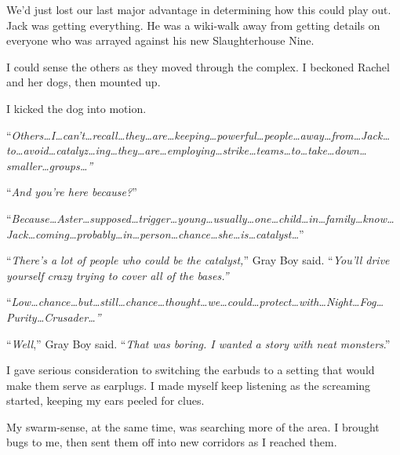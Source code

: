We'd just lost our last major advantage in determining how this could play out.  Jack was getting everything.  He was a wiki-walk away from getting details on everyone who was arrayed against his new Slaughterhouse Nine.



I could sense the others as they moved through the complex.  I beckoned Rachel and her dogs, then mounted up.



I kicked the dog into motion.



``\emph{Others\ldots I\ldots can't\ldots recall\ldots  they\ldots are\ldots keeping\ldots powerful\ldots people\ldots away\ldots from\ldots Jack\ldots to\ldots avoid\ldots catalyz\ldots ing\ldots they\ldots are\ldots employing\ldots strike\ldots teams\ldots to\ldots take\ldots down\ldots smaller\ldots groups\ldots''}



``\emph{And you're here because?}''



``\emph{Because\ldots Aster\ldots supposed\ldots trigger\ldots young\ldots usually\ldots one\ldots child\ldots in\ldots family\ldots know\ldots Jack\ldots coming\ldots probably\ldots in\ldots person\ldots chance\ldots she\ldots is\ldots catalyst\ldots}''



``\emph{There's a lot of people who could be the catalyst,}'' Gray Boy said.  ``\emph{You'll drive yourself crazy trying to cover all of the bases.''}



``\emph{Low\ldots chance\ldots but\ldots still\ldots chance\ldots thought\ldots we\ldots could\ldots protect\ldots with\ldots Night\ldots Fog\ldots Purity\ldots Crusader\ldots''}



``\emph{Well},'' Gray Boy said.  ``\emph{That was boring.  I wanted a story with neat monsters}.''



I gave serious consideration to switching the earbuds to a setting that would make them serve as earplugs.  I made myself keep listening as the screaming started, keeping my ears peeled for clues.



My swarm-sense, at the same time, was searching more of the area.  I brought bugs to me, then sent them off into new corridors as I reached them.



